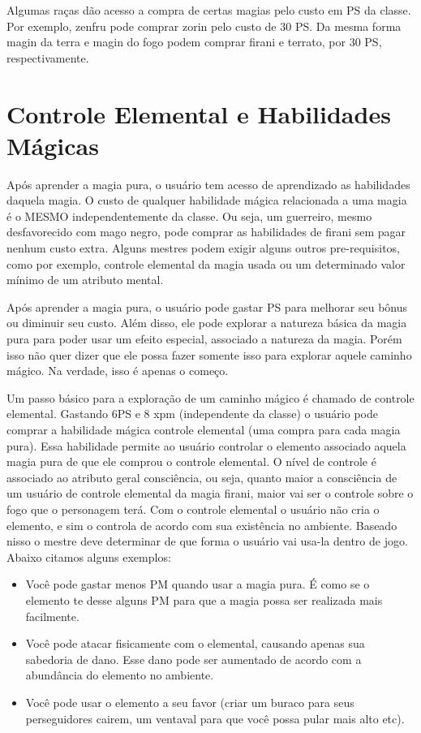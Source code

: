 Algumas raças dão acesso a compra de certas magias pelo custo em PS da classe. Por exemplo, zenfru pode comprar zorin pelo custo de 30 PS. Da mesma forma magin da terra e magin do fogo podem comprar firani e terrato, por 30 PS, respectivamente.

\section{Controle Elemental e Habilidades Mágicas}
Após aprender a magia pura, o usuário tem acesso de aprendizado as habilidades daquela magia. O custo de qualquer habilidade mágica relacionada a uma magia é o MESMO independentemente da classe. Ou seja, um guerreiro, mesmo desfavorecido com mago negro, pode comprar as habilidades de firani sem pagar nenhum custo extra. Alguns mestres podem exigir alguns outros pre-requisitos, como por exemplo, controle elemental da magia usada ou um determinado valor mínimo de um atributo mental.


Após aprender a magia pura, o usuário pode gastar PS para melhorar seu bônus ou diminuir seu custo. Além disso, ele pode explorar a natureza básica da magia pura para poder usar um efeito especial, associado a natureza da magia. Porém isso não quer dizer que ele possa fazer somente isso para explorar aquele caminho mágico. Na verdade, isso é apenas o começo.

Um passo básico para a exploração de um caminho mágico é chamado de controle elemental. Gastando 6PS e 8 xpm (independente da classe) o usuário pode comprar a habilidade mágica controle elemental (uma compra para cada magia pura). Essa habilidade permite ao usuário controlar o elemento associado aquela magia pura de que ele comprou o controle elemental. O nível de controle é associado ao atributo geral consciência, ou seja, quanto maior a consciência de um usuário de controle elemental da magia firani, maior vai ser o controle sobre o fogo que o personagem terá. Com o controle elemental o usuário não cria o elemento, e sim o controla de acordo com sua existência no ambiente. Baseado nisso o mestre deve determinar de que forma o usuário vai usa-la dentro de jogo. Abaixo citamos alguns exemplos:

\begin{itemize}
	\item Você pode gastar menos PM quando usar a magia pura. É como se o elemento te desse alguns PM para que a magia possa ser realizada mais facilmente.
	\item Você pode atacar fisicamente com o elemental, causando apenas sua sabedoria de dano. Esse dano pode ser aumentado de acordo com a abundância do elemento no ambiente.
	\item Você pode usar o elemento a seu favor (criar um buraco para seus perseguidores cairem, um ventaval para que você possa pular mais alto etc).
\end{itemize}

